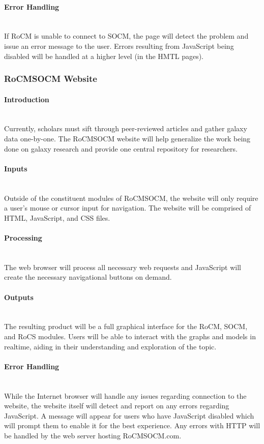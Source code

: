 \documentclass[titlepage]{article}
\newcommand{\myparagraph}[1]{\paragraph{#1}\mbox{}\\}
\begin{document}
\myparagraph{Error Handling}
If RoCM is unable to connect to SOCM, the page will detect the problem and issue an error message to the user. Errors resulting from JavaScript being disabled will be handled at a higher level (in the HMTL pages).

\subsubsection{RoCMSOCM Website}

\myparagraph{Introduction}
Currently, scholars must sift through peer-reviewed articles and gather galaxy data one-by-one. The RoCMSOCM website will help generalize the work being done on galaxy research and provide one central repository for researchers.

\myparagraph{Inputs}
Outside of the constituent modules of RoCMSOCM, the website will only require a user's mouse or cursor input for navigation. The website will be comprised of HTML, JavaScript, and CSS files. 

\myparagraph{Processing}
The web browser will process all necessary web requests and JavaScript will create the necessary navigational buttons on demand.

\myparagraph{Outputs}
The resulting product will be a full graphical interface for the RoCM, SOCM, and RoCS modules. Users will be able to interact with the graphs and models in realtime, aiding in their understanding and exploration of the topic.


\myparagraph{Error Handling}
While the Internet browser will handle any issues regarding connection to the website, the website itself will detect and report on any errors regarding JavaScript. A message will appear for users who have JavaScript disabled which will prompt them to enable it for the best experience. Any errors with HTTP will be handled by the web server hosting RoCMSOCM.com.
\end{document}
